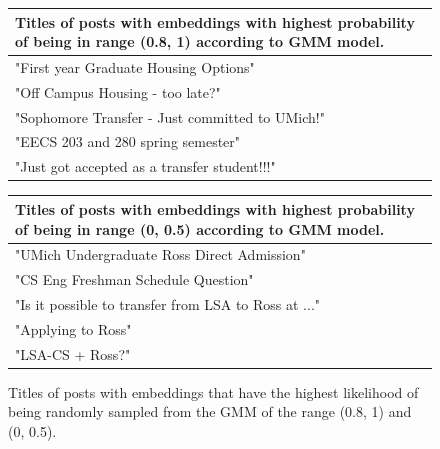 \documentclass[11pt,a4paper]{article}
\begin{document}
    \begin{figure}
        \begin{minipage}{0.5\textwidth}
            \begin{center}
                \begin{tabular}{ |p{}| }
                    \hline
                    Titles of posts with embeddings with highest probability of being in range (0.8, 1) according to GMM model. \\
                    \hline 
                    "First year Graduate Housing Options" \\
                    \hline
                    "Off Campus Housing - too late?" \\
                    \hline
                    "Sophomore Transfer - Just committed to UMich!" \\
                    \hline
                    "EECS 203 and 280 spring semester" \\
                    \hline
                    "Just got accepted as a transfer student!!!" \\
                    \hline
                \end{tabular}
            \end{center}


        \end{minipage}
        \begin{minipage}{0.5\textwidth}
            \begin{center}
                \begin{tabular}{ |p{}| }
                    \hline
                    Titles of posts with embeddings with highest probability of being in range (0, 0.5) according to GMM model. \\
                    \hline 
                    "UMich Undergraduate Ross Direct Admission" \\
                    \hline
                    "CS Eng Freshman Schedule Question" \\
                    \hline
                    "Is it possible to transfer from LSA to Ross at ..." \\
                    \hline
                    "Applying to Ross" \\
                    \hline
                    "LSA-CS + Ross?" \\
                    \hline
                \end{tabular}   
            \end{center}

        \end{minipage}

        \caption{Titles of posts with embeddings that have the highest likelihood of being randomly sampled from the GMM of the range (0.8, 1) and (0, 0.5).}

        \label{fig:task3res2}
    \end{figure}
\end{document}
